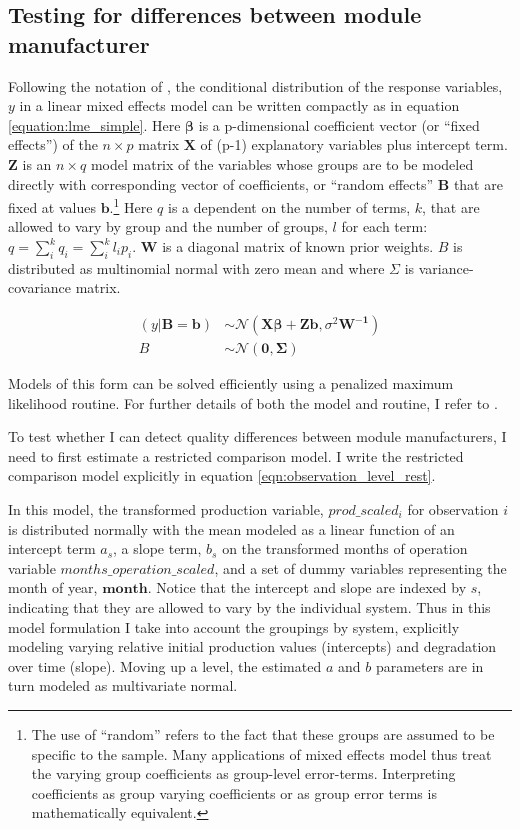 \documentclass[a4paper]{article}
\begin{document}
\subsection{Testing for differences between module manufacturer}
Following the notation of \citet{bates_fitting_2015}, the conditional distribution of the response variables, $y$ in a linear mixed effects model can be written compactly as in equation \ref{equation:lme_simple}. Here $\mathbf{\beta}$ is a p-dimensional coefficient vector (or  ``fixed effects'') of the $n \times p$ matrix $\mathbf{X}$ of (p-1) explanatory variables plus intercept term. $\mathbf{Z}$ is an $n \times q$ model matrix of the variables whose groups are to be modeled directly with corresponding vector of coefficients, or ``random effects'' $\mathbf{B}$ that are fixed at values $\mathbf{b}$.\footnote{The use of ``random'' refers to the fact that these groups are assumed to be specific to the sample. Many applications of mixed effects model thus treat the varying group coefficients as group-level error-terms. Interpreting coefficients as group varying coefficients or as group error terms is mathematically equivalent.} Here $q$ is a dependent on the number of terms, $k$, that are allowed to vary by group and the number of groups, $l$ for each term: $q=\sum_i^k q_i = \sum_i^k l_i p_i$.  $\mathbf{W}$ is a diagonal matrix of known prior weights. $B$ is distributed as multinomial normal with zero mean and where $\Sigma$ is variance-covariance matrix.

\begin{align}
(y|\mathbf{B=b}) &\sim \mathcal{N}(\mathbf{X\beta + Zb}, \sigma^2\mathbf{W^{-1}})\\
B &\sim \mathcal{N}(\mathbf{0,\Sigma})
\label{equation:lme_simple}
\end{align}

Models of this form can be solved efficiently using a penalized maximum likelihood routine. For further details of both the model and routine, I refer to \citet{bates_fitting_2015}.

To test whether I can detect quality differences between module manufacturers, I need to first estimate a restricted comparison model. I write the restricted comparison model explicitly in equation \ref{eqn:observation_level_rest}.

In this model, the transformed production variable, $prod\_scaled_{i}$ for observation $i$ is distributed normally with the mean modeled as a linear function of an intercept term $a_s$, a slope term, $b_s$ on the transformed months of operation variable $months\_operation\_scaled$, and a set of dummy variables representing the month of year, $\mathbf{month}$. Notice that the intercept and slope are indexed by $s$, indicating that they are allowed to vary by the individual system. Thus in this model formulation I take into account the groupings by system, explicitly modeling varying relative initial production values (intercepts) and degradation over time (slope). Moving up a level, the estimated $a$ and $b$ parameters are in turn modeled as multivariate normal.
\end{document}
